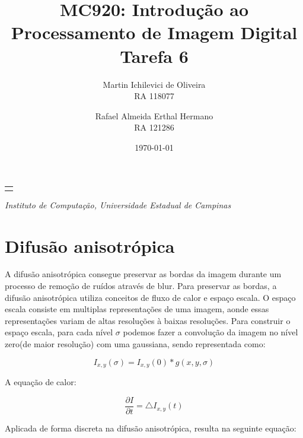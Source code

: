 \documentclass[10pt,a4paper]{article}
\makeatletter
\let\@institution\empty
\def\institution#1{\def\@institution{#1}}
\renewcommand{\maketitle}{
    \begin{center}
        {\Large\bfseries\@title\par\medskip}
        {\large
            \begin{tabular}[t]{c}%
                \@author
        \end{tabular}\par\medskip}
        {\itshape\@institution\par}
        {\itshape\@date\par}
\end{center}}
\makeatother
\begin{document}

\title{MC920: Introdução ao Processamento de Imagem Digital\\Tarefa 6}
\author{
    \begin{minipage}{6cm}
        \centering
        Martin Ichilevici de Oliveira\\
        RA 118077
    \end{minipage}
    \and
    \begin{minipage}{6cm}
        \centering
        Rafael Almeida Erthal Hermano\\
        RA 121286
    \end{minipage}
}
\institution{Instituto de Computação, Universidade Estadual de Campinas}
\date{\today}

\maketitle


\section{Difusão anisotrópica}
A difusão anisotrópica consegue preservar as bordas da imagem durante um processo de remoção de ruídos através de blur.
Para preservar as bordas, a difusão anisotrópica utiliza conceitos de fluxo de calor e espaço escala. O espaço escala consiste em multiplas representações de uma imagem, aonde essas representações variam de altas resoluções à baixas resoluções.
Para construir o espaço escala, para cada nível $\sigma$ podemos fazer a convolução da imagem no nível zero(de maior resolução) com uma gaussiana, sendo representada como:

\begin{equation}
  I_{x,y}(\sigma) = I_{x,y}(0) * g(x,y,\sigma)
  \label{eq:escale_space}
\end{equation}

A equação de calor:

\begin{equation}
  \frac{\partial I}{\partial t} = \bigtriangleup I_{x,y}(t)
  \label{eq:heat_flow}
\end{equation}

Aplicada de forma discreta na difusão anisotrópica, resulta na seguinte equação:
\end{document}
